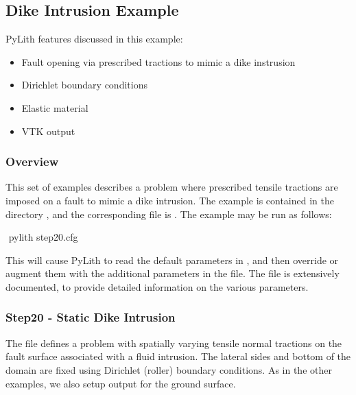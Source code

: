 \subsection{Dike Intrusion Example}
\label{sec:example:3dhex8:dike}

PyLith features discussed in this example:
\begin{itemize}
\item Fault opening via prescribed tractions to mimic a dike instrusion
\item Dirichlet boundary conditions
\item Elastic material
\item VTK output
\end{itemize}

\subsubsection{Overview}

This set of examples describes a problem where prescribed tensile
tractions are imposed on a fault to mimic a dike intrusion. The example
is contained in the directory , and the corresponding
 file is . The example may be run
as follows:
\begin{shell}
$$ pylith step20.cfg
\end{shell}
This will cause PyLith to read the default parameters in ,
and then override or augment them with the additional parameters in
the  file. The  file is extensively
documented, to provide detailed information on the various parameters.


\subsubsection{Step20 - Static Dike Intrusion}

The  file defines a problem with spatially varying
tensile normal tractions on the fault surface associated with a fluid
intrusion. The lateral sides and bottom of the domain are fixed using
Dirichlet (roller) boundary conditions. As in the other examples,
we also setup output for the ground surface.

